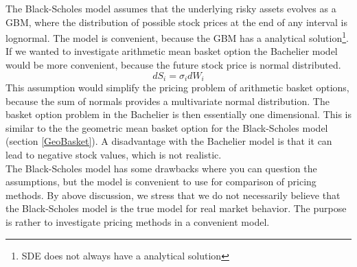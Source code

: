 The Black-Scholes model assumes that the underlying risky assets evolves as a GBM, where the distribution of possible stock prices at the end of any interval is lognormal. The model is convenient, because the GBM has a analytical solution\footnote{SDE does not always have a analytical solution}. If we wanted to investigate arithmetic mean basket option the Bachelier model would be more convenient, because the future stock price is normal distributed. 
\begin{equation*}
dS_i=\sigma_i dW_i
\end{equation*}
This assumption would simplify the pricing problem of arithmetic basket options, because the sum of normals provides a multivariate normal distribution. The basket option problem in the Bachelier is then essentially one dimensional. This is similar to the the geometric mean basket option for the Black-Scholes model (section \ref{GeoBasket}). A disadvantage with the Bachelier model is that it can lead to negative stock values, which is not realistic.\\

The Black-Scholes model has some drawbacks where you can question the assumptions, but the model is convenient to use for comparison of pricing methods. By above discussion, we stress that we do not necessarily believe that the Black-Scholes model is the true model for real market behavior. The purpose is rather to investigate pricing methods in a convenient model.

